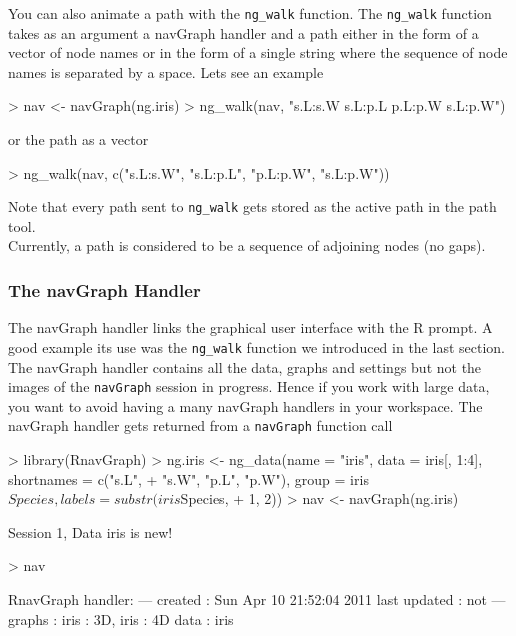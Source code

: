 \documentclass[12pt,oneside,titlepage,letter]{article}
\newcommand{\modify}[1]{{\color{blue}#1}}
\begin{document}
You can also animate a path with the \texttt{ng\_walk} function. The \texttt{ng\_walk} function takes as an argument a navGraph handler and a path either in the form of a vector of node names or in the form of a single string where the sequence of node names is separated by a space. Lets see an example

\begin{Schunk}
\begin{Sinput}
> nav <- navGraph(ng.iris)
> ng_walk(nav, "s.L:s.W s.L:p.L p.L:p.W s.L:p.W")
\end{Sinput}
\end{Schunk}
or the path as a vector
\begin{Schunk}
\begin{Sinput}
> ng_walk(nav, c("s.L:s.W", "s.L:p.L", "p.L:p.W", "s.L:p.W"))
\end{Sinput}
\end{Schunk}
Note that every path sent to \texttt{ng\_walk} gets stored as the active path in the path tool.\\

\modify{Currently, a path is considered to be a sequence of adjoining nodes (no gaps).}

\subsubsection{The navGraph Handler}
The navGraph handler links the graphical user interface with the R prompt. A good example its use was the \texttt{ng\_walk} function we introduced in the last section. The navGraph handler contains all the data, graphs and settings \modify{but not the images} of the \texttt{navGraph} session in progress. Hence if you work with large data, you want to avoid having a many navGraph handlers in your workspace. The navGraph handler gets returned from a \texttt{navGraph} function call
\begin{Schunk}
\begin{Sinput}
> library(RnavGraph)
> ng.iris <- ng_data(name = "iris", data = iris[, 1:4], shortnames = c("s.L", 
+     "s.W", "p.L", "p.W"), group = iris$Species, labels = substr(iris$Species, 
+     1, 2))
> nav <- navGraph(ng.iris)
\end{Sinput}
\begin{Soutput}
Session 1, Data iris is new!
\end{Soutput}
\begin{Sinput}
> nav
\end{Sinput}
\begin{Soutput}
RnavGraph handler:
---
created       : Sun Apr 10 21:52:04 2011 
last updated  : not 
---
graphs        : iris : 3D, iris : 4D 
data          : iris 
\end{Soutput}
\end{Schunk}
\end{document}

